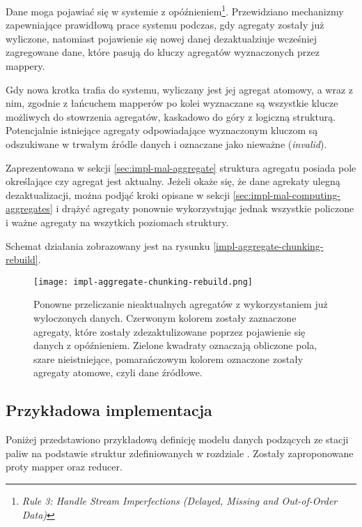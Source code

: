 Dane moga pojawiać się w systemie z opóźnieniem\cite{stream-processing-streamsql}\footnote{\emph{Rule 3: Handle Stream Imperfections (Delayed, Missing and Out-of-Order Data)}}. Przewidziano mechanizmy zapewniające prawidłową prace systemu podczas, gdy agregaty zostały już wyliczone, natomiast pojawienie się nowej danej dezaktualziuje wcześniej zagregowane dane, które pasują do kluczy agregatów wyznaczonych przez mappery.

Gdy nowa krotka trafia do systemu, wyliczany jest jej agregat atomowy, a wraz z nim, zgodnie z łańcuchem mapperów po kolei wyznaczane są wszystkie klucze możliwych do stowrzenia agregatów, kaskadowo do góry z logiczną strukturą. Potencjalnie istniejące agregaty odpowiadające wyznaczonym kluczom są odszukiwane w trwałym źródle danych i oznaczane jako nieważne (\emph{invalid}).

Zaprezentowana w sekcji \ref{sec:impl-mal-aggregate} struktura agregatu posiada pole określające czy agregat jest aktualny. Jeżeli okaże się, że dane agrekaty ulegną dezaktualizacji, można podjąć kroki opisane w sekcji \ref{sec:impl-mal-computing-aggregates} i drążyć agregaty ponownie wykorzystując jednak wszystkie policzone i ważne agregaty na wszytkich poziomach struktury.

Schemat działania zobrazowany jest na rysunku \ref{impl-aggregate-chunking-rebuild}.

\begin{figure}[h!]
  \centering
    \texttt{[image: impl-aggregate-chunking-rebuild.png]}
  \caption{Ponowne przeliczanie nieaktualnych agregatów z wykorzystaniem już wyloczonych danych. Czerwonym kolorem zostały zaznaczone agregaty, które zostały zdezaktulizowane poprzez pojawienie się danych z opóźnieniem. Zielone kwadraty oznaczają obliczone pola, szare nieistniejące, pomarańczowym kolorem oznaczone zostały agregaty atomowe, czyli dane źródłowe.}
  \label{fig:impl-aggregate-chunking-rebuild}
\end{figure}

\subsection{Przykładowa implementacja}

Poniżej przedstawiono przykładową definicję modelu danych podzących ze stacji paliw na podstawie struktur zdefiniowanych w rozdziale \label{sec:impl-mal-aggregate}. Zostały zaproponowane proty mapper oraz reducer.





